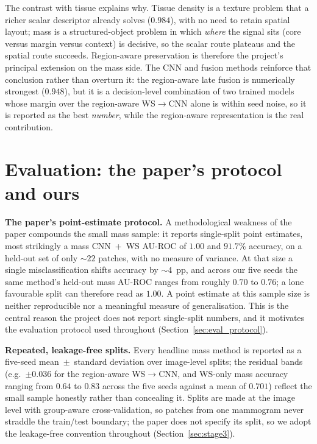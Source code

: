 The contrast with tissue explains why. Tissue density is a texture problem that
a richer scalar descriptor already solves ($0.984$), with no need to retain spatial
layout; mass is a structured-object problem in which \emph{where} the signal sits (core
versus margin versus context) is decisive, so the scalar route plateaus and the spatial
route succeeds. Region-aware preservation is therefore the project's principal extension on
the mass side. The CNN and fusion methods reinforce that
conclusion rather than overturn it: the region-aware late fusion is numerically strongest
($0.948$), but it is a decision-level combination of two trained models whose margin over
the region-aware WS$\rightarrow$CNN alone is within seed noise, so it is reported as the
best \emph{number}, while the region-aware representation is the real contribution.

\section{Evaluation: the paper's protocol and ours} \label{sec:eval_disc}

\textbf{The paper's point-estimate protocol.} A methodological weakness of the paper
compounds the small mass sample: it reports single-split point estimates, most
strikingly a mass CNN~+~WS AU-ROC of $1.00$ and $91.7\%$ accuracy, on a held-out set of
only ${\sim}22$ patches, with no measure of variance. At that size a single misclassification
shifts accuracy by ${\sim}4$~pp, and across our five seeds the same method's held-out mass
AU-ROC ranges from roughly $0.70$ to $0.76$; a lone favourable split can therefore read as
$1.00$. A point estimate at this sample size is neither reproducible nor a meaningful
measure of generalisation. This is the central reason the project does not report
single-split numbers, and it motivates the evaluation protocol used throughout
(Section~\ref{sec:eval_protocol}).

\textbf{Repeated, leakage-free splits.} Every headline mass method is reported as a
five-seed mean~$\pm$~standard deviation over image-level splits; the residual bands
(e.g.\ $\pm0.036$ for the region-aware WS$\rightarrow$CNN, and WS-only mass accuracy ranging
from $0.64$ to $0.83$ across the five seeds against a mean of $0.701$) reflect the small sample honestly rather than
concealing it. Splits are made at the image level with group-aware cross-validation, so
patches from one mammogram never straddle the train/test boundary; the paper does not
specify its split, so we adopt the leakage-free convention throughout
(Section~\ref{sec:stage3}).

